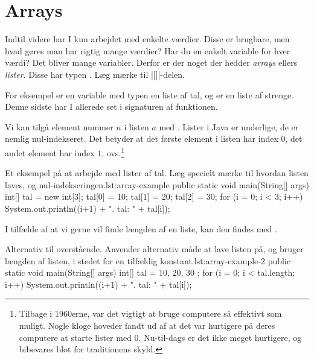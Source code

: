 \section{Arrays}



    Indtil videre har I kun arbejdet med enkelte værdier. Disse er
    brugbare, men hvad gøres man har rigtig mange værdier? Har du
    en enkelt variable for hver værdi? Det bliver mange variabler.
    Derfor er der noget der hedder \emph{arrays} ellers \emph{lister}.
    Disse har typen . Læg mærke til
    \JavaInline|[]|-delen.

    For eksempel er en variable med typen  en liste
    af tal, og  er en liste af strenge. Denne
    sidste har I allerede set i signaturen af 
    funktionen.

    Vi kan tilgå element nummer \(n\) i listen \(a\) med
    .  Lister i Java er underlige, de er nemlig
    nul-indekseret. Det betyder at det første element i listen har
    index \(0\), det andet element har index \(1\),
    ovs.\footnote{Tilbage i 1960erne, var det vigtigt at bruge
    computere så effektivt som muligt. Nogle kloge hoveder
    fandt ud af at det var hurtigere på deres computere at starte
    lister med 0. Nu-til-dags er det ikke meget hurtigere, og
    bibevares blot for traditionens skyld.}

    \begin{JavaCode}{Et eksempel på at arbejde med lister af tal. Læg specielt mærke til hvordan listen laves, og nul-indekseringen.}{lst:array-example}
        public static void main(String[] args) {
            int[] tal = new int[3];
            tal[0] = 10;
            tal[1] = 20;
            tal[2] = 30;
            for (i = 0; i < 3; i++) {
                System.out.println((i+1) + ". tal: "
                                         + tal[i]);
            }
        }
    \end{JavaCode}

    I tilfælde af at vi gerne vil finde længden af en liste, kan den findes med
    .

    \begin{JavaCode}{Alternativ til overstående. Anvender alternativ måde at lave listen på, og bruger længden af listen, i stedet for en tilfældig konstant.}{lst:array-example-2}
        public static void main(String[] args) {
            int[] tal = { 10, 20, 30 };
            for (i = 0; i < tal.length; i++) {
                System.out.println((i+1) + ". tal: "
                                         + tal[i]);
            }
        }
    \end{JavaCode}


